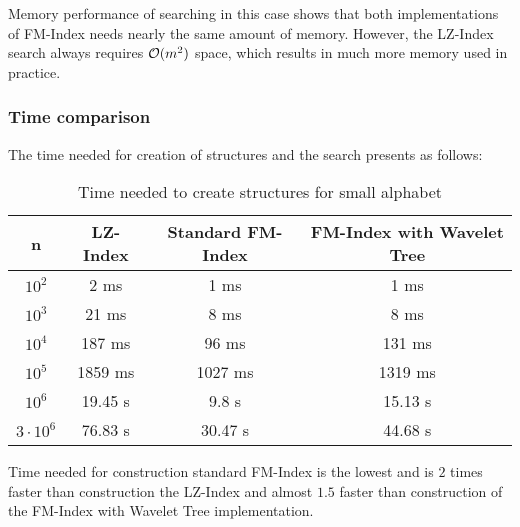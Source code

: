 Memory performance of searching in this case shows that both implementations of FM-Index needs nearly the same amount of memory. However, the LZ-Index search always requires $\mathcal{O}(m^2)$ space, which results in much more memory used in practice.


\subsubsection{Time comparison}
The time needed for creation of structures and the search presents as follows:

\begin{table}[H]
\begin{center}
\caption{Time needed to create structures for small alphabet}
\begin{tabular}{|c|c|c|c|}
\hline
\rowcolor[HTML]{C0C0C0}
n & LZ-Index & Standard FM-Index & FM-Index with Wavelet Tree \\ \hline
$10^{2}$ & 2 ms & 1 ms & 1 ms \\ \hline
$10^{3}$ & 21 ms & 8 ms & 8 ms \\ \hline
$10^{4}$ & 187 ms & 96 ms & 131 ms \\ \hline
$10^{5}$ & 1859 ms & 1027 ms & 1319 ms \\ \hline
$10^{6}$ & 19.45 s & 9.8 s & 15.13 s \\ \hline
$3 \cdot 10^{6}$ & 76.83 s & 30.47 s & 44.68 s \\ \hline
\end{tabular}
\end{center}
\end{table}

Time needed for construction standard FM-Index is the lowest and is $2$ times faster than construction the LZ-Index and almost $1.5$ faster than construction of the FM-Index with Wavelet Tree implementation.

